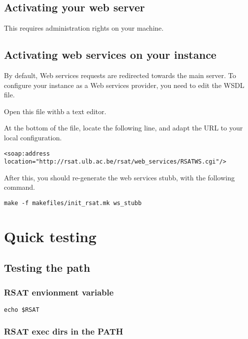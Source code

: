 \documentclass[12pt,a4paper, oneside]{scrreprt} %
\begin{document}
\subsection{Activating your web server}

This requires administration rights on your machine.

\tbw

\subsection{Activating web services on your \RSAT instance}

By default, Web services requests are redirected towards the main
\RSAT server. To configure your \RSAT instance as a Web services
provider, you need to edit the WSDL file.

Open this file withb a text editor.


At the bottom of the file, locate the following line, and adapt the
URL to your local configuration.

\begin{verbatim}
<soap:address location="http://rsat.ulb.ac.be/rsat/web_services/RSATWS.cgi"/>
\end{verbatim}

After this, you should re-generate the web services stubb, with the following command.

  \begin{lstlisting}
make -f makefiles/init_rsat.mk ws_stubb
  \end{lstlisting}

\section{Quick testing}

\subsection{Testing the path}

\subsubsection{RSAT envionment variable}

\begin{lstlisting}
echo $RSAT
\end{lstlisting}

\subsubsection{RSAT exec dirs in the PATH}
\end{document}
